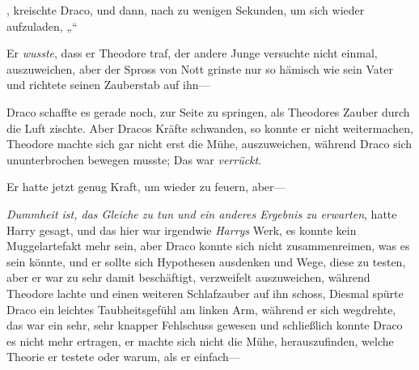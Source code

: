 \later

, kreischte Draco, und dann, nach zu wenigen Sekunden, um sich wieder aufzuladen, „“

Er \emph{wusste}, dass er Theodore traf, der andere Junge versuchte nicht einmal, auszuweichen, aber der Spross von Nott grinste nur so hämisch wie sein Vater und richtete seinen Zauberstab auf ihn—

Draco schaffte es gerade noch, zur Seite zu springen, als Theodores Zauber durch die Luft zischte. Aber Dracos Kräfte schwanden, so konnte er nicht weitermachen, Theodore machte sich gar nicht erst die Mühe, auszuweichen, während Draco sich ununterbrochen bewegen musste; Das war \emph{verrückt}.

Er hatte jetzt genug Kraft, um wieder zu feuern, aber—

\emph{Dummheit ist, das Gleiche zu tun und ein anderes Ergebnis zu erwarten}, hatte Harry gesagt, und das hier war irgendwie \emph{Harrys} Werk, es konnte kein Muggelartefakt mehr sein, aber Draco konnte sich nicht zusammenreimen, was es sein könnte, und er sollte sich Hypothesen ausdenken und Wege, diese zu testen, aber er war zu sehr damit beschäftigt, verzweifelt auszuweichen, während Theodore lachte und einen weiteren Schlafzauber auf ihn schoss, Diesmal spürte Draco ein leichtes Taubheitsgefühl am linken Arm, während er sich wegdrehte, das war ein sehr, sehr knapper Fehlschuss gewesen und schließlich konnte Draco es nicht mehr ertragen, er machte sich nicht die Mühe, herauszufinden, welche Theorie er testete oder warum, als er einfach—

